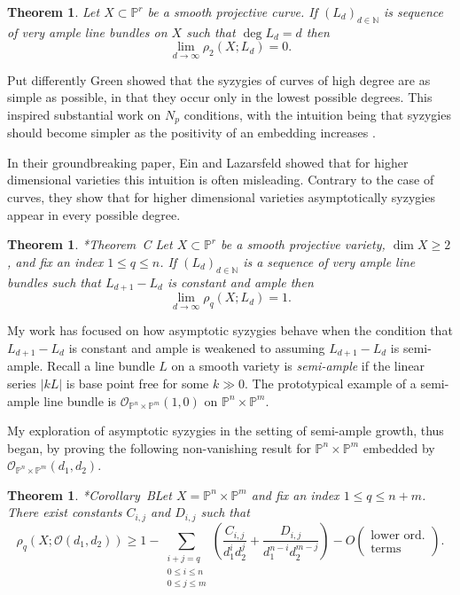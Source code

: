 \documentclass[10pt,reqno]{amsart}
\newtheorem{theorem}[lemma]{Theorem}
\theoremstyle{remark}
\renewcommand{\O}{\mathcal{O}}
\newcommand{\N}{\mathbb{N}}
\renewcommand{\P}{\mathbb{P}}
\begin{document}
\begin{theorem}\cite{green84-I}
Let $X\subset \P^r$ be a smooth projective curve. If $(L_{d})_{d\in\N}$ is sequence of very ample line bundles on $X$ such that $\deg L_{d} = d$ then 
\[
\lim_{d\to \infty} \rho_{2}\left(X;L_{d}\right) = 0.
\]
\end{theorem}

Put differently Green showed that the syzygies of curves of high degree are as simple as possible, in that they occur only in the lowest possible degrees. This inspired substantial work on $N_{p}$ conditions, with the intuition being that syzygies should become simpler as the positivity of an embedding increases \cite{ottavianiPaoletti01, einLazarsfeld93}.  

In their groundbreaking paper, Ein and Lazarsfeld showed that for higher dimensional varieties this intuition is often misleading. Contrary to the case of curves, they show that for higher dimensional varieties  asymptotically syzygies appear in every possible degree. 
  
\begin{theorem}\cite{einLazarsfeld12}*{Theorem~C}
Let $X\subset \P^r$ be a smooth projective variety, $\dim X \geq2$, and fix an index $1\leq q \leq n$. If $(L_{d})_{d\in\N}$ is a sequence of very ample line bundles such that $L_{d+1}-L_{d}$ is constant and ample then
\[
\lim_{d\to\infty} \rho_{q}\left(X; L_d\right) = 1.
\]
\end{theorem}

My work has focused on how asymptotic syzygies behave when the condition that $L_{d+1}-L_{d}$ is constant and ample is weakened to assuming $L_{d+1}-L_{d}$ is semi-ample. Recall a line bundle $L$ on a smooth variety is \textit{semi-ample} if the linear series $|kL|$ is base point free for some $k\gg0$. The prototypical example of a semi-ample line bundle is $\O_{\P^{n}\times\P^{m}}(1,0)$ on $\P^{n}\times \P^{m}$. 

My exploration of asymptotic syzygies in the setting of semi-ample growth, thus began, by proving the following non-vanishing result for $\P^{n}\times\P^{m}$ embedded by $\O_{\P^{n}\times\P^{m}}(d_{1},d_{2})$. 

\begin{theorem}\cite{bruce19-semiample}*{Corollary~B}\label{thm:bruce-semiample}
Let $X=\P^{n}\times\P^{m}$ and fix an index $1\leq q \leq n+m$. There exist constants $C_{i,j}$ and $D_{i,j}$ such that
\[
\rho_{q}\left(X; \O\left(d_1,d_2\right)\right)\geq1-\sum_{\substack{i+j=q \\ 0\leq i \leq n \\ 0\leq j \leq m}}\left(
\frac{C_{i,j}}{d_1^id_2^j}+\frac{D_{i,j}}{d_1^{n-i}d_2^{m-j}}\right)-O\left(\begin{matrix}\text{lower ord.}\\ \text{terms}\end{matrix}\right).
\]
\end{theorem}
\end{document}
